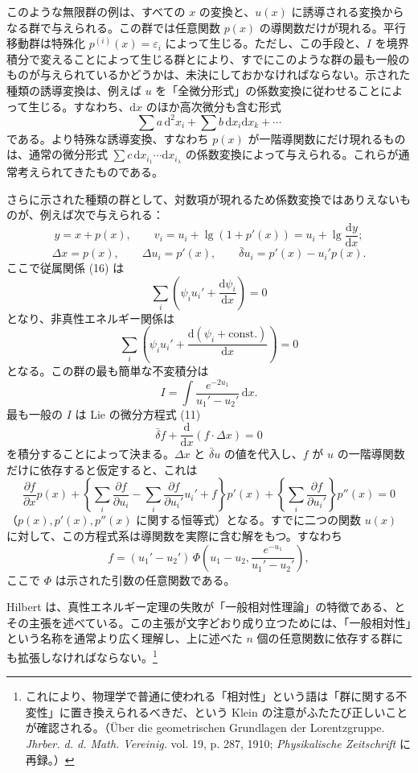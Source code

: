 \documentclass[11pt]{article}
\newcommand{\D}{\Delta}
\newcommand{\eps}{\varepsilon}
\providecommand{\dd}{\mathrm d}
\providecommand{\bd}{\bar{\delta}}
\providecommand{\p}{\partial}
\begin{document}
このような無限群の例は、すべての \(x\) の変換と、\(u(x)\) に誘導される変換からなる群で与えられる。この群では任意関数 \(p(x)\) の導関数だけが現れる。平行移動群は特殊化 \(p^{(i)}(x)=\eps_i\) によって生じる。ただし、この手段と、\(I\) を境界積分で変えることによって生じる群とにより、すでにこのような群の最も一般のものが与えられているかどうかは、未決にしておかなければならない。示された種類の誘導変換は、例えば \(u\) を「全微分形式」の係数変換に従わせることによって生じる。すなわち、\(\dd x\) のほか高次微分も含む形式
\[
\sum a\,\dd^2x_i+\sum b\,\dd x_i\dd x_k+\cdots
\]
である。より特殊な誘導変換、すなわち \(p(x)\) が一階導関数にだけ現れるものは、通常の微分形式 \(\sum c\,\dd x_{i_1}\cdots \dd x_{i_\lambda}\) の係数変換によって与えられる。これらが通常考えられてきたものである。

さらに示された種類の群として、対数項が現れるため係数変換ではありえないものが、例えば次で与えられる：
\[
y=x+p(x),\qquad
v_i=u_i+\lg(1+p'(x))=u_i+\lg\frac{\dd y}{\dd x};
\]
\[
\D x=p(x),\qquad
\D u_i=p'(x),\qquad
\bd u_i=p'(x)-u_i'p(x).
\]
ここで従属関係 (16) は
\[
\sum_i\left(\psi_i u_i'+\frac{\dd\psi_i}{\dd x}\right)=0
\]
となり、非真性エネルギー関係は
\[
\sum_i\left(\psi_i u_i'+
\frac{\dd(\psi_i+\mathrm{const.})}{\dd x}\right)=0
\]
となる。この群の最も簡単な不変積分は
\[
I=\int \frac{e^{-2u_1}}{u_1'-u_2'}\,\dd x.
\]
最も一般の \(I\) は Lie の微分方程式 (11)
\[
\bd f+\frac{\dd}{\dd x}(f\cdot \D x)=0
\]
を積分することによって決まる。\(\D x\) と \(\bd u\) の値を代入し、\(f\) が \(u\) の一階導関数だけに依存すると仮定すると、これは
\[
\frac{\p f}{\p x}p(x)
+\left\{\sum_i\frac{\p f}{\p u_i}
-\sum_i\frac{\p f}{\p u_i'}u_i'+f\right\}p'(x)
+\left\{\sum_i\frac{\p f}{\p u_i'}\right\}p''(x)=0
\]
（\(p(x),p'(x),p''(x)\) に関する恒等式）となる。すでに二つの関数 \(u(x)\) に対して、この方程式系は導関数を実際に含む解をもつ。すなわち
\[
f=(u_1'-u_2')\,
\Phi\!\left(u_1-u_2,\frac{e^{-u_1}}{u_1'-u_2'}\right),
\]
ここで \(\Phi\) は示された引数の任意関数である。

Hilbert は、真性エネルギー定理の失敗が「一般相対性理論」の特徴である、とその主張を述べている。この主張が文字どおり成り立つためには、「一般相対性」という名称を通常より広く理解し、上に述べた \(n\) 個の任意関数に依存する群にも拡張しなければならない。\footnote{これにより、物理学で普通に使われる「相対性」という語は「群に関する不変性」に置き換えられるべきだ、という Klein の注意がふたたび正しいことが確認される。（Über die geometrischen Grundlagen der Lorentzgruppe. \emph{Jhrber. d. d. Math. Vereinig.} vol. 19, p. 287, 1910; \emph{Physikalische Zeitschrift} に再録。）}
\end{document}
